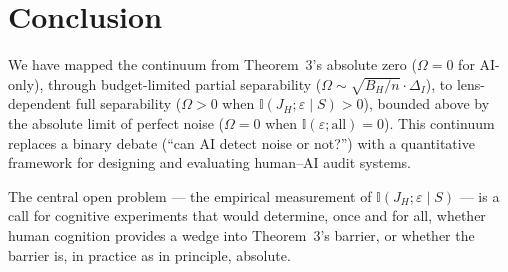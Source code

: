 \documentclass[12pt,a4paper]{article}
\newcommand{\I}{\mathbb{I}}
\begin{document}
\section{Conclusion}

We have mapped the continuum from Theorem~3's absolute zero ($\Omega = 0$
for AI-only), through budget-limited partial separability
($\Omega \sim \sqrt{B_H/n} \cdot \Delta_I$), to lens-dependent full
separability ($\Omega > 0$ when $\I(J_H; \varepsilon \mid S) > 0$), bounded
above by the absolute limit of perfect noise ($\Omega = 0$ when
$\I(\varepsilon; \text{all}) = 0$).  This continuum replaces a binary debate
(``can AI detect noise or not?'') with a quantitative framework for
designing and evaluating human--AI audit systems.

The central open problem — the empirical measurement of
$\I(J_H; \varepsilon \mid S)$ — is a call for cognitive experiments that
would determine, once and for all, whether human cognition provides a wedge
into Theorem~3's barrier, or whether the barrier is, in practice as in
principle, absolute.
\end{document}
